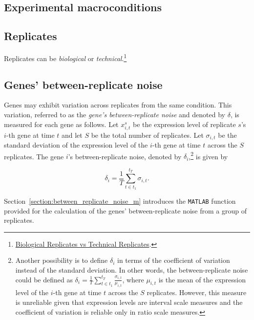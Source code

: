 \documentclass[final,letterpaper,twoside,12pt]{article}
\begin{document}
\subsection{Experimental macroconditions}

\subsection{Replicates}
\label{subsection:replicates_1}
\par Replicates can be \emph{biological} or \emph{technical}.\footnote{\href{https://honglangwang.wordpress.com/2012/04/24/【bio-glossary】biological-replicates-vs-technical-replicates/}{Biological Replicates vs Technical Replicates}.}

\subsection{Genes' between-replicate noise}
\label{subsection:replicates}
\par Genes may exhibit variation across replicates from the same condition. This variation, referred to as the \emph{gene's between-replicate noise} and denoted by $\delta$, is measured for each gene as follows. Let $x^s_{i,t}$ be the expression level of replicate $s$'s $i$-th gene at time $t$ and let $S$ be the total number of replicates. Let $\sigma_{i,t}$ be the standard deviation of the expression level of the $i$-th gene at time $t$ across the $S$ replicates. The gene $i$'s between-replicate noise, denoted by $\delta_i$,\footnote{Another possibility is to define $\delta_i$ in terms of the coefficient of variation instead of the standard deviation. In other words, the between-replicate noise could be defined as $\delta_i = \frac{1}{T} \sum_{t \in t_1}^{t_T} \frac{\sigma_{i,t}}{\mu_{i,t}}$, where $\mu_{i,t}$ is the mean of the expression level of the $i$-th gene at time $t$ across the $S$ replicates. However, this measure is unreliable given that expression levels are interval scale measures and the coefficient of variation is reliable only in ratio scale measures.} is given by

\begin{equation}
\label{equation:between_replicate_noise}
\delta_i = \frac{1}{T} \sum_{t \in t_1}^{t_T} \sigma_{i,t}.
\end{equation}

\par Section~\ref{section:between_replicate_noise_m} introduces the \texttt{MATLAB} function provided for the calculation of the genes' between-replicate noise from a group of replicates.
\end{document}
